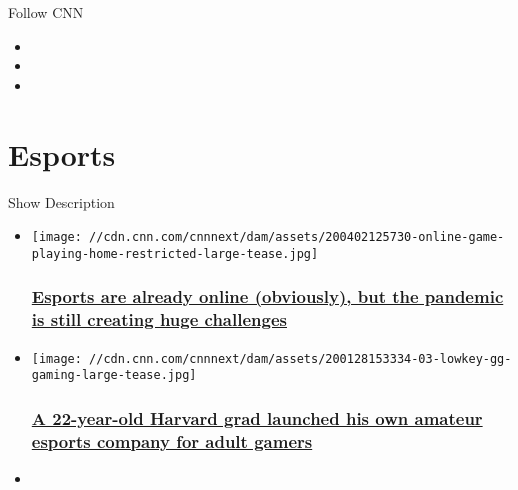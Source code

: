 Follow CNN

\begin{itemize}
\item
\item
\item
\end{itemize}

\hypertarget{esports}{%
\section{Esports}\label{esports}}

Show Description

\begin{itemize}
\item
  \href{/2020/04/03/tech/esports-sports-canceled-coronavirus/index.html}{}

  \texttt{[image: //cdn.cnn.com/cnnnext/dam/assets/200402125730-online-game-playing-home-restricted-large-tease.jpg]}

  \hypertarget{esports-are-already-online-obviously-but-the-pandemic-is-still-creating-huge-challenges}{%
  \subsubsection{\texorpdfstring{\href{/2020/04/03/tech/esports-sports-canceled-coronavirus/index.html}{Esports
  are already online (obviously), but the pandemic is still creating
  huge
  challenges}}{Esports are already online (obviously), but the pandemic is still creating huge challenges}}\label{esports-are-already-online-obviously-but-the-pandemic-is-still-creating-huge-challenges}}
\item
  \href{/2020/02/22/tech/lowkey-gg-league-of-legends-amateur/index.html}{}

  \texttt{[image: //cdn.cnn.com/cnnnext/dam/assets/200128153334-03-lowkey-gg-gaming-large-tease.jpg]}

  \hypertarget{a-22-year-old-harvard-grad-launched-his-own-amateur-esports-company-for-adult-gamers}{%
  \subsubsection{\texorpdfstring{\href{/2020/02/22/tech/lowkey-gg-league-of-legends-amateur/index.html}{A
  22-year-old Harvard grad launched his own amateur esports company for
  adult
  gamers}}{A 22-year-old Harvard grad launched his own amateur esports company for adult gamers}}\label{a-22-year-old-harvard-grad-launched-his-own-amateur-esports-company-for-adult-gamers}}
\item
  \href{/2020/01/26/tech/video-game-streaming-wars/index.html}{}


\end{itemize}
